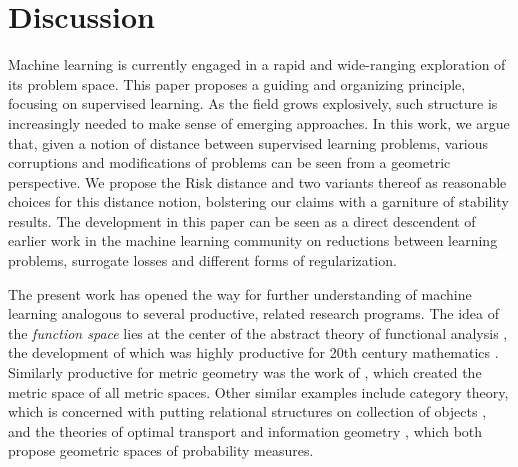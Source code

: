\documentclass[twoside,11pt]{article}
\begin{document}
\section{Discussion}
Machine learning is currently engaged in a rapid and wide-ranging exploration of its problem space. This paper proposes a guiding and organizing principle, focusing on supervised learning. As the field grows explosively, such structure is increasingly needed to make sense of emerging approaches. In this work, we argue that, given a notion of distance between supervised learning problems, various corruptions and modifications of problems can be seen from a geometric perspective. We propose the Risk distance and two variants thereof as reasonable choices for this distance notion, bolstering our claims with a garniture of stability results.
The development in this paper can be seen as a direct descendent of earlier work in the machine 
learning community on reductions between learning problems, surrogate 
losses and different forms of regularization.



The present work has opened the way for further understanding of machine 
learning analogous to several productive, related research programs. The idea of the \emph{function 
space} lies at the center of the abstract theory of functional analysis \citep[page 259]{birkhoff1984establishment}, the development of which was highly productive for 
20th century mathematics \citep{dieudonne1981history}. Similarly productive for metric geometry was the work of \citet{gromov_structures_1981}, which created the metric space of all metric spaces.
Other similar examples include category theory, which is concerned with putting relational structures on collection of objects \citep{mac2013categories}, and the theories of optimal transport \citep{Villani_old_and_new_2008} and information geometry \citep{amari_information_2016}, which both propose geometric spaces of probability measures.
\end{document}
